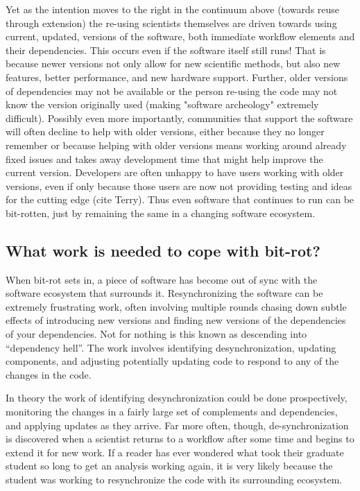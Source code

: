 \documentclass{sigchi}
\begin{document}
Yet as the intention moves to the right in the continuum above (towards reuse through extension) the re-using scientists themselves are driven towards using current, updated, versions of the software, both immediate workflow elements and their dependencies. This occurs even if the software itself still runs! That is because newer versions not only allow for new scientific methods, but also new features, better performance, and new hardware support. Further, older versions of dependencies may not be available or the person re-using the code may not know the version originally used (making "software archeology" extremely difficult). Possibly even more importantly, communities that support the software will often decline to help with older versions, either because they no longer remember or because helping with older versions means working around already fixed issues and takes away development time that might help improve the current version. Developers are often unhappy to have users working with older versions, even if only because those users are now not providing testing and ideas for the cutting edge (cite Terry). Thus even software that continues to run can be bit-rotten, just by remaining the same in a changing software ecosystem.

\subsection{What work is needed to cope with bit-rot?}

When bit-rot sets in, a piece of software has become out of sync with the software ecosystem that surrounds it. Resynchronizing the software can be extremely frustrating work, often involving multiple rounds chasing down subtle effects of introducing new versions and finding new versions of the dependencies of your dependencies.  Not for nothing is this known as descending into ``dependency hell''. The work involves identifying desynchronization, updating components, and adjusting potentially updating code to respond to any of the changes in the code.

In theory the work of identifying desynchronization could be done prospectively, monitoring the changes in a fairly large set of complements and dependencies, and applying updates as they arrive.  Far more often, though, de-synchronization is discovered when a scientist returns to a workflow after some time and begins to extend it for new work.  If a reader has ever wondered what took their graduate student so long to get an analysis working again, it is very likely because the student was working to resynchronize the code with its surrounding ecosystem.
\end{document}
